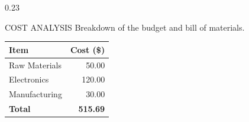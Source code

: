 \documentclass[final]{beamer}
\begin{document}
\begin{frame}[t]
\begin{columns}[T]
    \begin{column}{0.23\paperwidth}
        \begin{goldbox}{COST ANALYSIS}
            Breakdown of the budget and bill of materials.
            \vspace{1cm}
            \begin{center}
            \begin{tabular}{l r}
                \color{mccgold}\textbf{Item} & \color{mccgold}\textbf{Cost (\$)} \\
                \hline
                Raw Materials & 50.00 \\
                Electronics & 120.00 \\
                Manufacturing & 30.00 \\
                \textbf{Total} & \textbf{515.69} \\
            \end{tabular}
            \end{center}
        \end{goldbox}
    \end{column}

\end{columns}

\end{frame}
\end{document}
